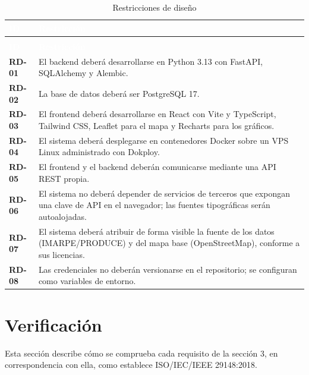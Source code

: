 \documentclass[11pt,a4paper,oneside]{article}
\begin{document}
{\small
\begin{xltabular}{\textwidth}{@{}>{\sffamily\bfseries}p{1.5cm}Y@{}}
\caption{Restricciones de diseño}\label{tab:rd}\\
\textcolor{white}{\sffamily\bfseries\footnotesize ID} & \textcolor{white}{\sffamily\bfseries\footnotesize Restricción}\\
\endfirsthead
{}\\
\textcolor{white}{\sffamily\bfseries\footnotesize ID} & \textcolor{white}{\sffamily\bfseries\footnotesize Restricción}\\
\endhead
RD-01 & El backend deberá desarrollarse en Python 3.13 con FastAPI, SQLAlchemy y Alembic.\\ \hline
{}RD-02 & La base de datos deberá ser PostgreSQL 17.\\ \hline
RD-03 & El frontend deberá desarrollarse en React con Vite y TypeScript, Tailwind CSS, Leaflet para el mapa y Recharts para los gráficos.\\ \hline
{}RD-04 & El sistema deberá desplegarse en contenedores Docker sobre un VPS Linux administrado con Dokploy.\\ \hline
RD-05 & El frontend y el backend deberán comunicarse mediante una API REST propia.\\ \hline
{}RD-06 & El sistema no deberá depender de servicios de terceros que expongan una clave de API en el navegador; las fuentes tipográficas serán autoalojadas.\\ \hline
RD-07 & El sistema deberá atribuir de forma visible la fuente de los datos (IMARPE/PRODUCE) y del mapa base (OpenStreetMap), conforme a sus licencias.\\ \hline
{}RD-08 & Las credenciales no deberán versionarse en el repositorio; se configuran como variables de entorno.\\ \hline
\end{xltabular}}
\vspace{0.6em}

\clearpage\section{Verificación}

Esta sección describe cómo se comprueba cada requisito de la sección 3, en correspondencia con ella, como establece ISO/IEC/IEEE 29148:2018.
\end{document}
